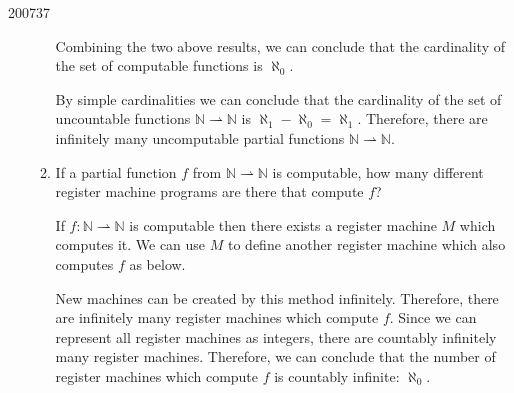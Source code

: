 \documentclass[10pt,\jkfside,a4paper]{article}
\begin{document}
\begin{examquestion}{2007}{3}{7}
\begin{enumerate}
\begin{enumerate}
Combining the two above results, we can conclude that the cardinality of the
set of computable functions is $\aleph_0$.

By simple cardinalities we can conclude that the cardinality of the set of
uncountable functions $\mathbb{N} \rightharpoonup \mathbb{N} $ is $\aleph_1
- \aleph_0 = \aleph_1$. Therefore, there are infinitely many uncomputable
partial functions $\mathbb{N} \rightharpoonup \mathbb{N} $.

\item If a partial function $f$ from $ \mathbb{N} \rightharpoonup
\mathbb{N} $ is computable, how many different register machine programs are
there that compute $f$?

If $f: \mathbb{N} \rightharpoonup \mathbb{N}$ is computable then there
exists a register machine $M$ which computes it. We can use $M$ to define
another register machine which also computes $f$ as below.
\begin{center}
\end{center}
New machines can be created by this method infinitely. Therefore, there are
infinitely many register machines which compute $f$. Since we can represent
all register machines as integers, there are countably infinitely many
register machines. Therefore, we can conclude that the number of register
machines which compute $f$ is countably infinite: $\aleph_0$.

\end{enumerate}

\end{enumerate}

\end{examquestion}
\end{document}

